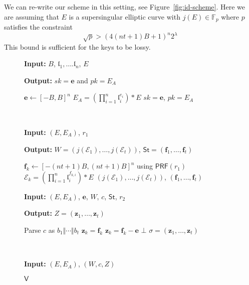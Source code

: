 \documentclass{llncs}
\newcommand{\E}{\mathcal{E}}
\newcommand{\F}{\mathbb{F}}
\renewcommand{\l}{\mathfrak{l}}
\newcommand{\e}{\mathbf{e}}
\newcommand{\f}{\mathbf{f}}
\newcommand{\z}{\mathbf{z}}
\newcommand{\IGen}{\mathsf{IGen}}
\newcommand{\PP}{\mathsf{P}}
\newcommand{\VV}{\mathsf{V}}
\newcommand{\St}{\textsf{St}}
\newcommand{\PRF}{\mathsf{PRF}}
\begin{document}
We can re-write our scheme in this setting, see Figure~\ref{fig:id-scheme}.
Here we are assuming that $E$ is a supersingular elliptic curve with $j(E) \in \F_p$ where $p$ satisfies the constraint
\begin{equation} \label{eq:lossy-p-bound}
  \sqrt{p} > (4(nt+1)B + 1)^{n} 2^\lambda
\end{equation}
This bound is sufficient for the keys to be lossy.


\begin{figure}
\begin{minipage}{.45\textwidth}
\begin{algorithm}[H]
	\caption{$\IGen$}
	\textbf{Input:} $B$, $\l_1, \dots. \l_n$, $E$

	\textbf{Output:} $sk =\e$ and $pk = E_A$

	\begin{algorithmic}[1]
		\State $\e \leftarrow [-B,B]^n$ 
		\State $E_A = ( \prod_{i=1}^n \l_i^{e_i} ) * E$
		\State \Return $sk= \e$, $pk = E_A$
	\end{algorithmic}
\end{algorithm}
\end{minipage}
 \ \ \ \ \ \ \ \ \ \ \ \ 
\begin{minipage}{0.45\textwidth}
\begin{algorithm}[H]
	\caption{$\PP_1$}
	\textbf{Input:} $(E,E_A)$,  $r_1$

	\textbf{Output:} $W = ( j(\E_1) , \dots, j(\E_t) )$, $\St = (\f_1, \dots, \f_t )$

	\begin{algorithmic}[1]
		\State $\f_k \leftarrow [-(nt+1)B,(nt+1)B]^n$ using $\PRF( r_1 )$
		\State $\E_k = ( \prod_{i=1}^n \l_i^{f_{k,i}} ) * E$
		\EndFor
		\State \Return $( j(\E_1) , \dots, j(\E_t) )$, $(\f_1, \dots, \f_t )$
	\end{algorithmic}
\end{algorithm}
\end{minipage}



\begin{minipage}{0.45\textwidth}
\begin{algorithm}[H]
	\caption{$\PP_2$}
	\textbf{Input:} $(E,E_A)$, $\e$, $W$, $c$, $\St$, $r_2$

	\textbf{Output:} $Z = (\z_1, \dots, \z_t)$

	\begin{algorithmic}[1]
		\State Parse $c$ as $b_1 \Vert \cdots \Vert b_t$
		\State $\z_k = \f_k$
		\Else
		\State $\z_k = \f_k - \e$
		\EndIf
		\If{$\z_{k} \not\in [-ntB,ntB]^n$} \State \Return $\bot$ \EndIf
		\EndFor
		\State \Return $\sigma = (\z_1, \dots, \z_t)$
	\end{algorithmic}
\end{algorithm}
\end{minipage}
 \ \ \ \ \ \ \ \ \ \ \ \ 
\begin{minipage}{0.45\textwidth}
\begin{algorithm}[H]
	\caption{$\VV$}
	\textbf{Input:} $(E,E_A)$, $(W,c,Z)$


\end{algorithm}
\end{minipage}
\end{figure}
\end{document}
